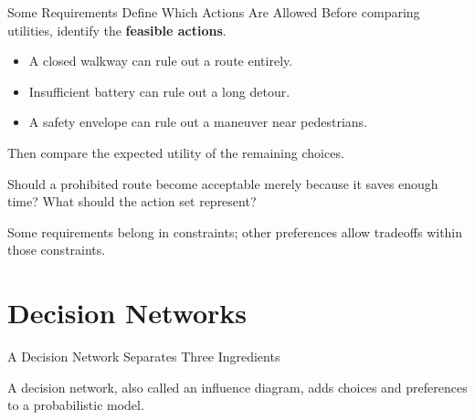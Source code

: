 \documentclass[aspectratio=169,10pt]{beamer}
\begin{document}
\begin{frame}{Some Requirements Define Which Actions Are Allowed}
  Before comparing utilities, identify the \textbf{feasible actions}.
  \begin{itemize}
    \item A closed walkway can rule out a route entirely.
    \item Insufficient battery can rule out a long detour.
    \item A safety envelope can rule out a maneuver near pedestrians.
  \end{itemize}
  Then compare the expected utility of the remaining choices.
  \begin{activity}
    Should a prohibited route become acceptable merely because it saves enough time? What should the action set represent?
  \end{activity}
  \begin{keyidea}
    Some requirements belong in constraints; other preferences allow tradeoffs within those constraints.
  \end{keyidea}
\end{frame}

\section{Decision Networks}

\begin{frame}{A Decision Network Separates Three Ingredients}
  \begin{center}
  \end{center}
  \begin{keyidea}
    A decision network, also called an influence diagram, adds choices and preferences to a probabilistic model.
  \end{keyidea}
\end{frame}
\end{document}
